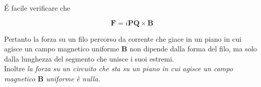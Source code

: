 \'E facile verificare che 

\begin{tcolorbox}[colback=yellow!10!white, colframe=orange!70!black, boxrule=0.8pt]
\begin{equation} 
     \mathbf{F} = i \mathbf{PQ} \times \mathbf{B}
\end{equation}
\end{tcolorbox}

Pertanto la forza su un filo percorso da corrente che giace in un piano in cui agisce un campo magnetico uniforme $\mathbf{B}$ non dipende dalla forma del filo, ma solo dalla lunghezza del segmento che unisce i suoi estremi. \\

Inoltre \emph{la forza su un circuito che sta su un piano in cui agisce un campo magnetico $\mathbf{B}$ uniforme è nulla.}

